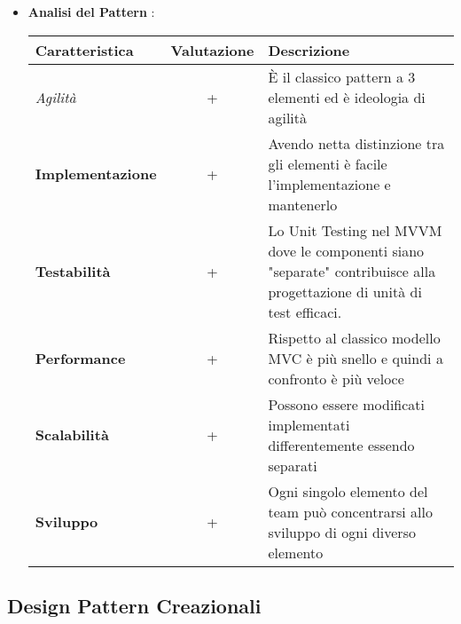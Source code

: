 {{{\begin{itemize}
				È da sottolineare il fatto che il ViewModel mantiene nel proprio stato non solo le informazioni recuperate attraverso il Model, ma anche lo stato attuale della visualizzazione: ciò gli consente di essere del tutto disaccoppiato dalla View. Inoltre il processo step-by-step descritto in precedenza risulta essere un “two-way”, funziona cioè in entrambe le direzioni.\\
				AngularJS implementa un modello basato su questa visione del pattern e utilizza HTML come linguaggio di templating, non richiede operazioni di DOM refresh e controlla attivamente le azioni utente ed eventi nel browser. 
				\item \textbf{Analisi del Pattern} :
				\small %
				{\renewcommand\arraystretch{1.2} %
					\begin{tabular}{|l|c|l|}
						\hline
						{\textbf{Caratteristica}}&{\textbf{Valutazione}}&{\textbf{Descrizione}}\\
						\hline
						\textit{Agilità} & + & È il classico pattern a 3 elementi ed è ideologia di agilità \\
						\hline
						\textbf{Implementazione} & + & Avendo netta distinzione tra gli elementi è facile l'implementazione e mantenerlo\\
						\hline
						\textbf{Testabilità} & + & Lo Unit Testing nel MVVM dove le componenti siano "separate" contribuisce alla progettazione di unità di test efficaci.\\
						\hline
						\textbf{Performance} & + & Rispetto al classico modello MVC è più snello e quindi a confronto è più veloce \\
						\hline
						\textbf{Scalabilità} & + & Possono essere modificati implementati differentemente essendo separati\\
						\hline
						\textbf{Sviluppo} & + & Ogni singolo elemento del team può concentrarsi allo sviluppo di ogni diverso elemento \\
						\hline
					\end{tabular}
				}
			\end{itemize}
		}
	}
	\subsection{Design Pattern Creazionali}{
}}
